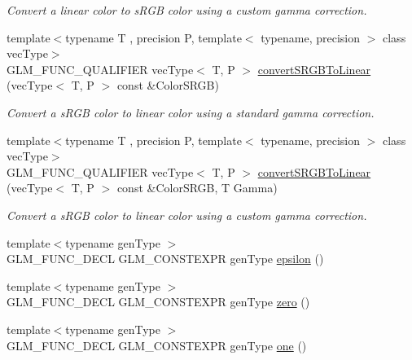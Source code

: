 \begin{DoxyCompactItemize}
\begin{DoxyCompactList}\small\item\em Convert a linear color to s\+R\+G\+B color using a custom gamma correction. \end{DoxyCompactList}\item 
{\footnotesize template$<$typename T , precision P, template$<$ typename, precision $>$ class vec\+Type$>$ }\\G\+L\+M\+\_\+\+F\+U\+N\+C\+\_\+\+Q\+U\+A\+L\+I\+F\+I\+E\+R vec\+Type$<$ T, P $>$ \hyperlink{group__gtc__color__space_ga28e98e64347cf385cadc1ceb4def55c9}{convert\+S\+R\+G\+B\+To\+Linear} (vec\+Type$<$ T, P $>$ const \&Color\+S\+R\+G\+B)
\begin{DoxyCompactList}\small\item\em Convert a s\+R\+G\+B color to linear color using a standard gamma correction. \end{DoxyCompactList}\item 
{\footnotesize template$<$typename T , precision P, template$<$ typename, precision $>$ class vec\+Type$>$ }\\G\+L\+M\+\_\+\+F\+U\+N\+C\+\_\+\+Q\+U\+A\+L\+I\+F\+I\+E\+R vec\+Type$<$ T, P $>$ \hyperlink{group__gtc__color__space_ga61c4f0efdf55c29d9cfbd26141fddef8}{convert\+S\+R\+G\+B\+To\+Linear} (vec\+Type$<$ T, P $>$ const \&Color\+S\+R\+G\+B, T Gamma)
\begin{DoxyCompactList}\small\item\em Convert a s\+R\+G\+B color to linear color using a custom gamma correction. \end{DoxyCompactList}\item 
{\footnotesize template$<$typename gen\+Type $>$ }\\G\+L\+M\+\_\+\+F\+U\+N\+C\+\_\+\+D\+E\+C\+L G\+L\+M\+\_\+\+C\+O\+N\+S\+T\+E\+X\+P\+R gen\+Type \hyperlink{group__gtc__constants_ga2a1e57fc5592b69cfae84174cbfc9429}{epsilon} ()
\item 
{\footnotesize template$<$typename gen\+Type $>$ }\\G\+L\+M\+\_\+\+F\+U\+N\+C\+\_\+\+D\+E\+C\+L G\+L\+M\+\_\+\+C\+O\+N\+S\+T\+E\+X\+P\+R gen\+Type \hyperlink{group__gtc__constants_ga788f5a421fc0f40a1296ebc094cbaa8a}{zero} ()
\item 
{\footnotesize template$<$typename gen\+Type $>$ }\\G\+L\+M\+\_\+\+F\+U\+N\+C\+\_\+\+D\+E\+C\+L G\+L\+M\+\_\+\+C\+O\+N\+S\+T\+E\+X\+P\+R gen\+Type \hyperlink{group__gtc__constants_ga39c2fb227631ca25894326529bdd1ee5}{one} ()
\item 

\end{DoxyCompactItemize}

